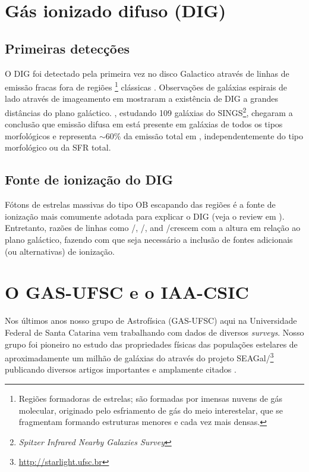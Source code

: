 \section{Gás ionizado difuso (DIG)}
\label{sec:intro:DIG}

\subsection{Primeiras detecções}
O DIG foi detectado pela primeira vez no disco Galactico através de linhas de emissão fracas fora de regiões \Hii\footnote{Regiões formadoras de estrelas; são formadas por imensas nuvens de gás molecular, originado pelo esfriamento de gás do meio interestelar, que se fragmentam formando estruturas menores e cada vez mais densas.} clássicas \citep{Reynolds.PhD.1971}. Observações de galáxias espirais de lado através de imageamento em \Ha \citep{Dettmar.1990, HoopesWaltGreen.1996, HoopesWaltRand.1999} mostraram a existência de DIG a grandes distâncias do plano galáctico. \cite{Oey.etal.2007}, estudando 109 galáxias do SINGS\footnote{\em Spitzer Infrared Nearby Galaxies Survey}, chegaram a conclusão que emissão difusa em \Ha está presente em galáxias de todos os tipos morfológicos e representa $\sim60\%$ da emissão total em \Ha, independentemente do tipo morfológico ou da SFR total.

\subsection{Fonte de ionização do DIG}
Fótons de estrelas massivas do tipo OB escapando das regiões \Hii é a fonte de ionização mais comumente adotada para explicar o DIG (veja o review em \citealt{Haffner.etal.2009}). Entretanto, razões de linhas como \nii/\Ha, \sii/\Ha, and \oiii/\Hb crescem com a altura em relação ao plano galáctico, fazendo com que seja necessário a inclusão de fontes adicionais (ou alternativas) de ionização.


\section{O GAS-UFSC e o IAA-CSIC}
\label{sec:intro:UFSCeIAA}

Nos últimos anos nosso grupo de Astrofísica (GAS-UFSC) aqui na Universidade Federal de Santa Catarina vem trabalhando com dados de diversos {\em surveys}. Nosso grupo foi pioneiro no estudo das propriedades físicas das populações estelares de aproximadamente um milhão de galáxias do \SDSS através do projeto SEAGal/\starlight\footnote{\href{http://starlight.ufsc.br}{http://starlight.ufsc.br}} publicando diversos artigos importantes e amplamente citados \citep[e.g., ][]{CidFernandes.etal.2005a, Mateus.etal.2006a, Stasinska.etal.2006a, Asari.etal.2007a, Stasinska.etal.2008a, CidFernandes.etal.2011a}.

